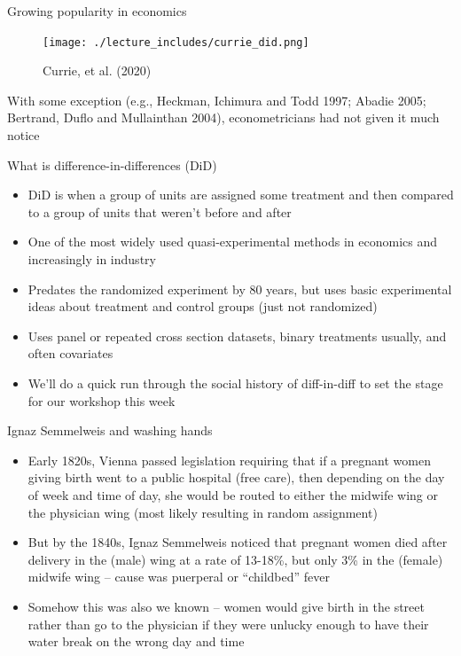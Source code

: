 \documentclass{beamer}
\begin{document}
\begin{frame}{Growing popularity in economics}

	\begin{figure}
	\caption{Currie, et al. (2020)}
	\texttt{[image: ./lecture\_includes/currie\_did.png]}
	\end{figure}

\bigskip

\footnotesize

With some exception (e.g., Heckman, Ichimura and Todd 1997; Abadie 2005; Bertrand, Duflo and Mullainthan 2004), econometricians had not given it much notice

\end{frame}








\begin{frame}{What is difference-in-differences (DiD)}

\begin{itemize}
\item DiD is when a group of units are assigned some treatment and then compared to a group of units that weren't before and after
\item One of the most widely used quasi-experimental methods in economics and increasingly in industry
\item Predates the randomized experiment by 80 years, but uses basic experimental ideas about treatment and control groups (just not randomized)
\item Uses panel or repeated cross section datasets, binary treatments usually, and often covariates
\item We'll do a quick run through the social history of diff-in-diff to set the stage for our workshop this week
\end{itemize}
\end{frame}








\begin{frame}{Ignaz Semmelweis and washing hands}

\begin{itemize}
\item Early 1820s, Vienna passed legislation requiring that if a pregnant women giving birth went to a public hospital (free care), then depending on the day of week and time of day, she would be routed to either the midwife wing or the physician wing (most likely resulting in random assignment)
\item But by the 1840s, Ignaz Semmelweis noticed that pregnant women died after delivery in the (male) wing at a rate of 13-18\%, but only 3\% in the (female) midwife wing -- cause was puerperal or “childbed” fever
\item Somehow this was also we known -- women would give birth in the street rather than go to the physician if they were unlucky enough to have their water break on the wrong day and time
\end{itemize}

\end{frame}
\end{document}
